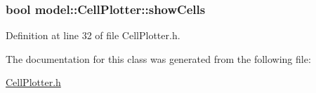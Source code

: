 \subsubsection[{show\+Cells}]{\setlength{\rightskip}{0pt plus 5cm}bool model\+::\+Cell\+Plotter\+::show\+Cells}\label{classmodel_1_1_cell_plotter_a24a673e5fc567058b76d79b6c0b5e5f0}


Definition at line 32 of file Cell\+Plotter.\+h.



The documentation for this class was generated from the following file\+:\begin{DoxyCompactItemize}
\item 
\hyperlink{_cell_plotter_8h}{Cell\+Plotter.\+h}\end{DoxyCompactItemize}
